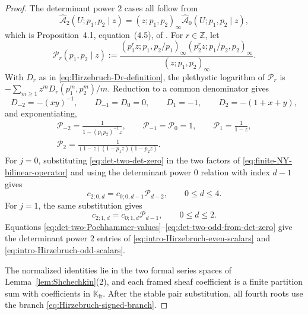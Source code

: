\documentclass{amsart}
\theoremstyle{definition}
\numberwithin{equation}{section}
\newcommand{\Z}{\mathbb Z}
\newcommand{\K}{\mathbb K}
\begin{document}
\begin{proof}
The determinant power \(2\) cases all follow from
\begin{equation}
 \widehat{\mathcal A}_2(U;p_1,p_2\mid z)
 =(z;p_1,p_2)_\infty
  \widehat{\mathcal A}_0(U;p_1,p_2\mid z),
\label{eq:det-two-det-zero}
\end{equation}
which is Proposition~4.1, equation~(4.5), of \cite{Shchechkin}.  For \(r\in\Z\), let
\begin{equation}
 \mathscr P_r(p_1,p_2\mid z)
 :=\frac{(p_1^rz;p_1,p_2/p_1)_\infty
          (p_2^rz;p_1/p_2,p_2)_\infty}
         {(z;p_1,p_2)_\infty}.
\label{eq:det-two-Pochhammer-ratio}
\end{equation}
With \(D_r\) as in \eqref{eq:Hirzebruch-Dr-definition}, the plethystic logarithm of \(\mathscr P_r\) is \(-\sum_{m\geq1}z^mD_r(p_1^m,p_2^m)/m\).  Reduction to a common denominator gives
\[
 D_{-2}=-(xy)^{-1},\qquad D_{-1}=D_0=0,
 \qquad D_1=-1,\qquad D_2=-(1+x+y),
\]
and exponentiating,
\begin{equation}
\begin{gathered}
 \mathscr P_{-2}=\frac1{1-(p_1p_2)^{-1}z},\qquad
 \mathscr P_{-1}=\mathscr P_0=1,\qquad
 \mathscr P_1=\frac1{1-z},\\
 \mathscr P_2=\frac1{(1-z)(1-p_1z)(1-p_2z)}.
\end{gathered}
\label{eq:det-two-Pochhammer-values}
\end{equation}
For \(j=0\), substituting \eqref{eq:det-two-det-zero} in the two factors of \eqref{eq:finite-NY-bilinear-operator} and using the determinant power \(0\) relation with index \(d-1\) gives
\begin{equation}
 c_{2;0,d}=c_{0;0,d-1}\mathscr P_{d-2},
 \qquad 0\leq d\leq4.
\label{eq:det-two-factor-from-det-zero}
\end{equation}
For \(j=1\), the same substitution gives
\begin{equation}
 c_{2;1,d}=c_{0;1,d}\mathscr P_{d-1},
 \qquad 0\leq d\leq2.
\label{eq:det-two-odd-from-det-zero}
\end{equation}
Equations \eqref{eq:det-two-Pochhammer-values}--\eqref{eq:det-two-odd-from-det-zero} give the determinant power \(2\) entries of \eqref{eq:intro-Hirzebruch-even-scalars} and \eqref{eq:intro-Hirzebruch-odd-scalars}.

The normalized identities lie in the two formal series spaces of Lemma~\ref{lem:Shchechkin}(2), and each framed sheaf coefficient is a finite partition sum with coefficients in \(\K_{\mathrm{fr}}\).  After the stable pair substitution, all fourth roots use the branch \eqref{eq:Hirzebruch-signed-branch}.
\end{proof}
\end{document}
